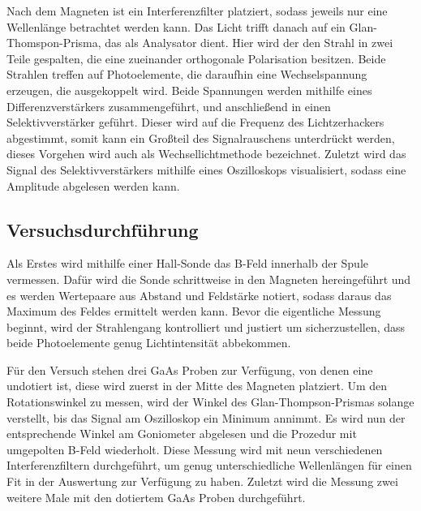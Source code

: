 Nach dem Magneten ist ein Interferenzfilter platziert, sodass jeweils nur eine Wellenlänge betrachtet werden kann. Das Licht trifft danach auf
ein Glan-Thomspon-Prisma, das als Analysator dient. Hier wird der den Strahl in zwei Teile gespalten, die eine zueinander orthogonale Polarisation besitzen. Beide Strahlen treffen
auf Photoelemente, die daraufhin eine Wechselspannung erzeugen, die ausgekoppelt wird. Beide Spannungen werden mithilfe eines Differenzverstärkers
zusammengeführt, und anschließend in einen Selektivverstärker geführt. Dieser wird auf die Frequenz des Lichtzerhackers abgestimmt, somit kann ein
Großteil des Signalrauschens unterdrückt werden, dieses Vorgehen wird auch als Wechsellichtmethode bezeichnet.
Zuletzt wird das Signal des Selektivverstärkers mithilfe eines Oszilloskops visualisiert, sodass eine Amplitude abgelesen werden kann.

\subsection{Versuchsdurchführung}

Als Erstes wird mithilfe einer Hall-Sonde das B-Feld innerhalb der Spule vermessen. Dafür wird die Sonde schrittweise in den Magneten hereingeführt
und es werden Wertepaare aus Abstand und Feldstärke notiert, sodass daraus das Maximum des Feldes ermittelt werden kann.
Bevor die eigentliche Messung beginnt, wird der Strahlengang kontrolliert und justiert um sicherzustellen, dass beide Photoelemente genug Lichtintensität
abbekommen.

Für den Versuch stehen drei GaAs Proben zur Verfügung, von denen eine undotiert ist, diese wird zuerst in der Mitte des Magneten platziert.
Um den Rotationswinkel zu messen, wird der Winkel des Glan-Thompson-Prismas
solange verstellt, bis das Signal am Oszilloskop ein Minimum annimmt. Es wird nun der entsprechende Winkel am Goniometer abgelesen und
die Prozedur mit umgepolten B-Feld wiederholt. Diese Messung wird mit neun verschiedenen Interferenzfiltern durchgeführt, um genug unterschiedliche Wellenlängen für einen
Fit in der Auswertung zur Verfügung zu haben.
Zuletzt wird die Messung zwei weitere Male mit den dotiertem GaAs Proben durchgeführt.